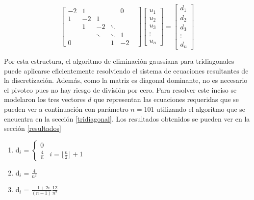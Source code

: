     \[ \begin{bmatrix}
-2 & 1 & & & 0\\
1 & -2 & 1 & & & \\
    & 1 & -2 & \ddots & \\
    &    & \ddots &  \ddots & 1\\
0   &    &   & 1 & -2
     \end{bmatrix}
     \begin{bmatrix}
           u_{1}\\
           u_{2} \\
           u_{3}\\ 
           \vdots\\ 
           u_{n}  
     \end{bmatrix}
      =
     \begin{bmatrix}
          d_{1} \\
          d_{2}\\
          d_{3}\\
         \vdots\\ 
         d_{n}  
     \end{bmatrix} \]\label{laplaciano}

Por esta estructura,  el algoritmo de eliminación gaussiana para tridiagonales puede aplicarse eficientemente resolviendo el sistema de ecuaciones resultantes de la discretización. Además, como la matriz es diagonal dominante, no es necesario el pivoteo pues no hay riesgo de división por cero. 
Para resolver este inciso se modelaron los tres vectores $d$ que representan las ecuaciones requeridas que se pueden ver a continuación con parámetro $n=101$ utilizando el algoritmo que se encuentra en la sección \ref{tridiagonal}.
Los resultados obtenidos se pueden ver en la sección \ref{resultados} 

\begin{enumerate}[label=\alph*)] %
\label{ec_ej4}
\item d$_{i}$ = 
    $\begin{cases}
      0\\
      \frac{4}{n} & i=\lfloor \frac{n}{2} \rfloor   +1
    \end{cases}$

\item d$_{i}$ = $\frac{4}{n^{2}}$

\item d$_{i}$ = $\frac{-1+2i}{(n-1)}\frac{12}{n^{2}}$

\end{enumerate}


